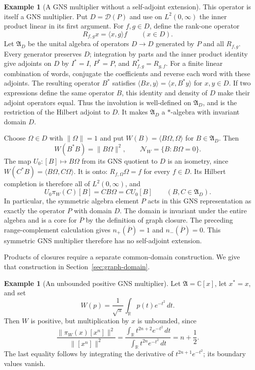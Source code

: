 \documentclass[11pt]{article}
\theoremstyle{definition}
\newtheorem{example}[theorem]{Example}
\theoremstyle{remark}
\numberwithin{equation}{section}
\newcommand{\R}{\mathbb R}
\newcommand{\C}{\mathbb C}
\begin{document}
\begin{example}[A GNS multiplier without a self-adjoint extension]
This operator is itself a GNS multiplier.  Put $D=\mathcal D(P)$ and use
on $L^2(0,\infty)$ the inner product linear in its first argument.
For $f,g\in D$, define the rank-one operator
\[
 R_{f,g}x=\langle x,g\rangle f\qquad(x\in D).
\]
Let $\mathfrak A_D$ be the unital algebra of operators $D\to D$
generated by $P$ and all $R_{f,g}$.  Every generator preserves $D$;
integration by parts and the inner product identity give adjoints on $D$
by $I^*=I$, $P^*=P$, and $R_{f,g}^*=R_{g,f}$.  For a finite linear combination of
words, conjugate the coefficients and reverse each word with these
adjoints.  The resulting operator $B^*$ satisfies
$\langle Bx,y\rangle=\langle x,B^*y\rangle$ for $x,y\in D$.
If two expressions define the same operator $B$, this identity and density
of $D$ make their adjoint operators equal.  Thus the involution is
well-defined on $\mathfrak A_D$, and is the restriction of the Hilbert
adjoint to $D$.  It makes $\mathfrak A_D$ a $*$-algebra with invariant
domain $D$.

Choose $\Omega\in D$ with $\|\Omega\|=1$ and put
$W(B)=\langle B\Omega,\Omega\rangle$ for $B\in\mathfrak A_D$.
Then
\[
 W(B^*B)=\|B\Omega\|^2,\qquad
 \mathcal N_W=\{B:B\Omega=0\}.
\]
The map $U_0:[B]\mapsto B\Omega$ from its GNS quotient to $D$ is an
isometry, since
$W(C^*B)=\langle B\Omega,C\Omega\rangle$.
It is onto: $R_{f,\Omega}\Omega=f$ for every $f\in D$.
Its Hilbert completion is therefore all of $L^2(0,\infty)$, and
\[
 U_0\pi_W(C)[B]=CB\Omega=C U_0[B]
 \qquad(B,C\in\mathfrak A_D).
\]
In particular, the symmetric algebra element $P$ acts in this GNS
representation as exactly the operator $P$ with domain $D$.
The domain is invariant under the entire algebra and is a core for
$\overline P$ by the definition of graph closure.  The preceding
range-complement calculation gives $n_+(\overline P)=1$ and
$n_-(\overline P)=0$.  This symmetric GNS multiplier therefore has no
self-adjoint extension.
\end{example}

Products of closures require a separate common-domain construction.
We give that construction in Section~\ref{sec:graph-domain}.

\begin{example}[An unbounded positive GNS multiplier]
Let $\mathfrak A=\C[x]$, let $x^*=x$, and set
\[
 W(p)=\frac1{\sqrt\pi}\int_{\R}p(t)e^{-t^2}\,dt.
\]
Then $W$ is positive, but multiplication by $x$ is unbounded, since
\[
 \frac{\|\pi_W(x)[x^n]\|^2}{\|[x^n]\|^2}
 =\frac{\int_{\R}t^{2n+2}e^{-t^2}\,dt}
        {\int_{\R}t^{2n}e^{-t^2}\,dt}
 =n+\frac12.
\]
The last equality follows by integrating the derivative of
$t^{2n+1}e^{-t^2}$; its boundary values vanish.
\end{example}
\end{document}
